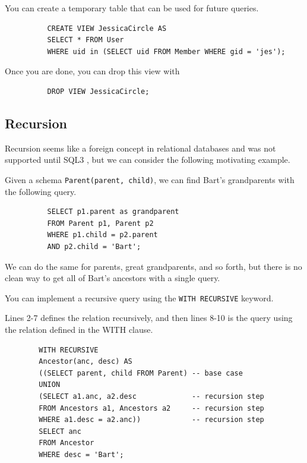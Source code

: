 \documentclass{article}
\begin{document}
      \begin{example}
        You can create a temporary table that can be used for future queries. 
        \begin{lstlisting}
          CREATE VIEW JessicaCircle AS 
          SELECT * FROM User 
          WHERE uid in (SELECT uid FROM Member WHERE gid = 'jes'); 
        \end{lstlisting}
        Once you are done, you can drop this view with 
        \begin{lstlisting}
          DROP VIEW JessicaCircle; 
        \end{lstlisting}
      \end{example}

  \subsection{Recursion} 

    Recursion seems like a foreign concept in relational databases and was not supported until SQL3 , but we can consider the following motivating example. 

    \begin{example}[Ancestors]
      Given a schema \texttt{Parent(parent, child)}, we can find Bart's grandparents with the following query. 
        \begin{lstlisting}
          SELECT p1.parent as grandparent 
          FROM Parent p1, Parent p2 
          WHERE p1.child = p2.parent 
          AND p2.child = 'Bart';
        \end{lstlisting}
        We can do the same for parents, great grandparents, and so forth, but there is no clean way to get all of Bart's ancestors with a single query.  
    \end{example} 

    \begin{definition}[Recursion]
      You can implement a recursive query using the \texttt{WITH RECURSIVE} keyword. 
    \end{definition}

    \begin{example}
      Lines 2-7 defines the relation recursively, and then lines 8-10 is the query using the relation defined in the WITH clause. 
      \begin{lstlisting}
        WITH RECURSIVE 
        Ancestor(anc, desc) AS 
        ((SELECT parent, child FROM Parent) -- base case
        UNION 
        (SELECT a1.anc, a2.desc             -- recursion step
        FROM Ancestors a1, Ancestors a2     -- recursion step
        WHERE a1.desc = a2.anc))            -- recursion step
        SELECT anc 
        FROM Ancestor 
        WHERE desc = 'Bart'; 
      \end{lstlisting}
    \end{example}
\end{document}
